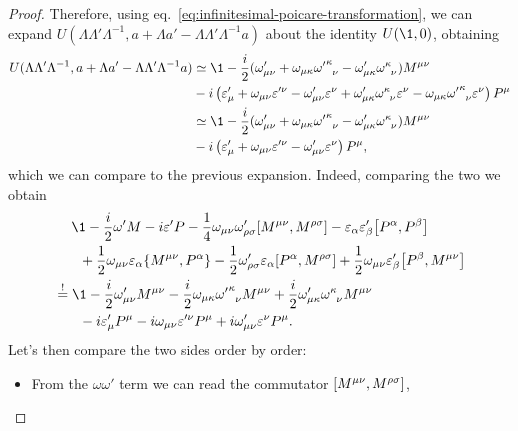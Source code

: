 \begin{mdframed}
\begin{proof}
    Therefore, using eq.~\eqref{eq:infinitesimal-poicare-transformation}, we can expand $U(\Lambda\Lambda'\Lambda^{-1},a + \Lambda a' - \Lambda\Lambda'\Lambda^{-1}a)$ about the identity $U(\1,0)$, obtaining
    \begin{align*}
        U(\Lambda\Lambda'\Lambda^{-1},a + \Lambda a' - \Lambda\Lambda'\Lambda^{-1}a) &\simeq \1 - \frac{i}{2} (\omega'_{\mu\nu} + \omega_{\mu\kappa}\tensor{{\omega'}}{^\kappa_\nu}-\omega'_{\mu\kappa} \tensor{\omega}{^\kappa_\nu})M^{\mu\nu} \\
        &- i \left( \epsilon'_\mu +\omega_{\mu\nu} \epsilon'^\nu - \omega'_{\mu\nu} \epsilon^\nu + \omega'_{\mu\kappa}\tensor{\omega}{^\kappa_\nu} \epsilon^\nu - \omega_{\mu\kappa} \tensor{{\omega'}}{^\kappa_\nu} \epsilon^\nu \right) P^\mu \\
        &\simeq \1 - \frac{i}{2} (\omega'_{\mu\nu} + \omega_{\mu\kappa}\tensor{{\omega'}}{^\kappa_\nu}-\omega'_{\mu\kappa} \tensor{\omega}{^\kappa_\nu})M^{\mu\nu} \\
        &- i \left( \epsilon'_\mu +\omega_{\mu\nu} \epsilon'^\nu - \omega'_{\mu\nu} \epsilon^\nu\right) P^\mu ,
    \end{align*}
    which we can compare to the previous expansion. Indeed, comparing the two we obtain
    \begin{align*}
        &\;\quad \1 -\frac{i}{2} \omega' M - i \epsilon' P 
        - \frac{1}{4} \omega_{\mu\nu} \omega'_{\rho\sigma} \comm{M^{\mu\nu}}{M^{\rho\sigma}} 
        - \epsilon_\alpha \epsilon'_\beta \comm{P^\alpha}{P^\beta} \\
        &\;\quad\;\; +\frac{1}{2} \omega_{\mu\nu} \epsilon_\alpha \{ M^{\mu\nu}, P^\alpha \} - \frac{1}{2} \omega'_{\rho\sigma} \epsilon_\alpha \comm{P^\alpha}{M^{\rho\sigma}} + \frac{1}{2} \omega_{\mu\nu} \epsilon'_\beta \comm{P^\beta}{M^{\mu\nu}} \\
        &\overset{!}{=} \1 - \frac{i}{2} \omega'_{\mu\nu} M^{\mu\nu} - \frac{i}{2} \omega_{\mu\kappa}\tensor{{\omega'}}{^\kappa_\nu} M^{\mu\nu} + \frac{i}{2} \omega'_{\mu\kappa} \tensor{\omega}{^\kappa_\nu} M^{\mu\nu} \\
        &\quad\;\;\;  - i \epsilon'_\mu P^\mu - i \omega_{\mu\nu} \epsilon'^\nu P^\mu + i \omega'_{\mu\nu} \epsilon^\nu P^\mu   .
    \end{align*}
    Let's then compare the two sides order by order:
    \begin{itemize}
        \item From the $\omega\omega'$ term we can read the commutator $\comm{M^{\mu\nu}}{M^{\rho\sigma}}$,

\end{itemize}
\end{proof}
\end{mdframed}
